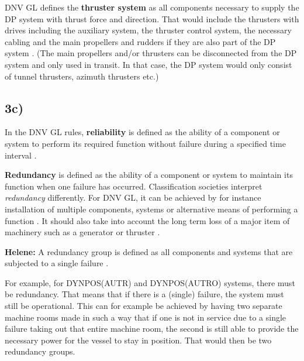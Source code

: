 DNV GL defines the \textbf{thruster system} as all components necessary to supply the DP system with thrust force and direction. That would include the thrusters with drives including the auxiliary system, the thruster control system, the necessary cabling and the main propellers and rudders if they are also part of the DP system \cite{RulesShipsDNVGLPart6Chap3}. (The main propellers and/or thrusters can be disconnected from the DP system and only used in transit. In that case, the DP system would only consist of tunnel thrusters, azimuth thrusters etc.)




\subsection*{3c)}

In the DNV GL rules, \textbf{reliability} is defined as the ability of a component or system to perform its required function without failure during a specified time interval \cite{RulesShipsDNVGLPart6Chap3}.

\textbf{Redundancy} is defined as the ability of a component or system to maintain its function when one failure has occurred.
Classification societies interpret \textit{redundancy} differently. For DNV GL, it can be achieved by for instance installation of multiple components, systems or alternative means of performing a function \cite{RulesShipsDNVGLPart6Chap3}. It should also take into account the long term loss  of a major item of machinery such as a generator or thruster \cite{RecommendedPractices_DP_DNVGL}.  %


\textbf{Helene:}
A redundancy group is defined as all components and systems that are subjected to a single failure \cite{RulesShipsDNVGLPart6Chap3}. 

For example, for DYNPOS(AUTR) and DYNPOS(AUTRO) systems, there must be redundancy. That means that if there is a (single) failure, the system must still be operational. This can for example be achieved by having two separate machine rooms made in such a way that if one is not in service due to a single failure taking out that entire machine room, the second is still able to provide the necessary power for the vessel to stay in position. That would then be two redundancy groups.   
 

